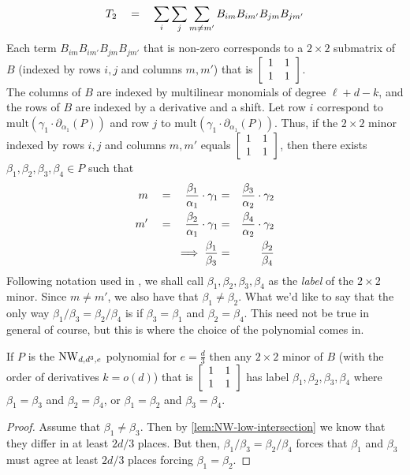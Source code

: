 \[
T_2 \quad = \quad \sum_i \sum_j \sum_{m\neq m'} B_{im}B_{im'}B_{jm}B_{jm'}
\]
Each term $B_{im}B_{im'}B_{jm}B_{jm'}$ that is non-zero corresponds to a $2\times 2$ submatrix of $B$ (indexed by rows $i,j$ and columns $m,m'$) that is $\left[\begin{array}{cc} 1 & 1\\ 1&1
  \end{array}\right]$. \\

The columns of $B$ are indexed by multilinear monomials of degree $\ell + d - k$, and the rows of $B$ are indexed by a derivative and a shift. 
Let row $i$ correspond to $\mathrm{mult}(\gamma_1 \cdot \partial_{\alpha_1}(P))$ and row $j$ to $\mathrm{mult}(\gamma_1 \cdot \partial_{\alpha_1}(P))$. 
Thus, if the $2\times 2$ minor indexed by rows $i,j$ and columns $m,m'$ equals $\left[\begin{array}{cc} 1 & 1\\ 1&1 \end{array}\right]$, then there exists $\beta_1, \beta_2,\beta_3,\beta_4 \in P$ such that
\begin{eqnarray*}
m \quad = \quad \frac{\beta_1}{\alpha_1}\cdot \gamma_1 & = & \frac{\beta_3}{\alpha_2} \cdot  \gamma_2\\
m' \quad = \quad \frac{\beta_2}{\alpha_1}\cdot \gamma_1 & = & \frac{\beta_4}{\alpha_2}\cdot \gamma_2\\
\implies \frac{\beta_1}{\beta_3} & = & \frac{\beta_2}{\beta_4}
\end{eqnarray*}
Following notation used in \cite{KLSS}, we shall call $\beta_1,\beta_2,\beta_3,\beta_4$ as the \emph{label} of the $2\times 2$ minor. 
Since $m\neq m'$, we also have that $\beta_1 \neq \beta_2$. 
What we'd like to say that the only way $\beta_1/\beta_3 = \beta_2/\beta_4$ is if $\beta_3 = \beta_1$ and $\beta_2 = \beta_4$. 
This need not be true in general of course, but this is where the choice of the polynomial comes in. 

\begin{claim}
If $P$ is the $\mathrm{NW}_{d,d^3, e}$ polynomial for $e = \frac{d}{3}$ then any $2\times 2$ minor of $B$ (with the order of derivatives $k = o(d)$) that is $\left[\begin{array}{cc} 1&1\\1&1\end{array}\right]$ has label $\beta_1,\beta_2,\beta_3,\beta_4$ where $\beta_1 = \beta_3$ and $\beta_2 = \beta_4$, or $\beta_1 = \beta_2$ and $\beta_3 = \beta_4$. 
\end{claim}
\begin{proof}
Assume that $\beta_1 \neq \beta_3$. 
Then by \autoref{lem:NW-low-intersection} we know that they differ in at least $2d/3$ places. 
But then, $\beta_1/\beta_3 = \beta_2/\beta_4$ forces that $\beta_1$ and $\beta_3$ must agree at least $2d/3$ places forcing $\beta_1 = \beta_2$. 
\end{proof}

